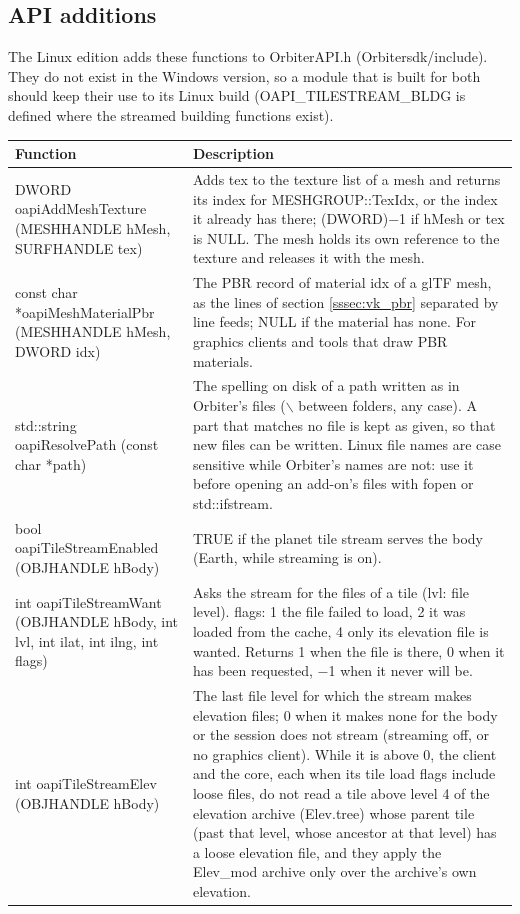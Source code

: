 \documentclass[Orbiter Developer Manual.tex]{subfiles}
\begin{document}
\begin{sloppypar}
\subsection{API additions}
\label{ssec:vk_api}
The Linux edition adds these functions to OrbiterAPI.h (Orbitersdk/include). They do not exist in the Windows version, so a module that is built for both should keep their use to its Linux build (OAPI\_TILESTREAM\_BLDG is defined where the streamed building functions exist).

	\begin{longtable}{ |>{\raggedright\arraybackslash}p{}|p{}| }
	\hline\rule{0pt}{2ex}
	\textbf{Function} & \textbf{Description}\\
	\hline\rule{0pt}{2ex}
	DWORD oapiAddMeshTexture (MESHHANDLE hMesh, SURFHANDLE tex) & Adds tex to the texture list of a mesh and returns its index for MESHGROUP::TexIdx, or the index it already has there; (DWORD)$-$1 if hMesh or tex is NULL. The mesh holds its own reference to the texture and releases it with the mesh.\\
	\hline\rule{0pt}{2ex}
	const char *oapiMeshMaterialPbr (MESHHANDLE hMesh, DWORD idx) & The PBR record of material idx of a glTF mesh, as the lines of section \ref{sssec:vk_pbr} separated by line feeds; NULL if the material has none. For graphics clients and tools that draw PBR materials.\\
	\hline\rule{0pt}{2ex}
	std::string oapiResolvePath (const char *path) & The spelling on disk of a path written as in Orbiter's files ($\backslash$ between folders, any case). A part that matches no file is kept as given, so that new files can be written. Linux file names are case sensitive while Orbiter's names are not: use it before opening an add-on's files with fopen or std::ifstream.\\
	\hline\rule{0pt}{2ex}
	bool oapiTileStreamEnabled (OBJHANDLE hBody) & TRUE if the planet tile stream serves the body (Earth, while streaming is on).\\
	\hline\rule{0pt}{2ex}
	int oapiTileStreamWant (OBJHANDLE hBody, int lvl, int ilat, int ilng, int flags) & Asks the stream for the files of a tile (lvl: file level). flags: 1 the file failed to load, 2 it was loaded from the cache, 4 only its elevation file is wanted. Returns 1 when the file is there, 0 when it has been requested, $-$1 when it never will be.\\
	\hline\rule{0pt}{2ex}
	int oapiTileStreamElev (OBJHANDLE hBody) & The last file level for which the stream makes elevation files; 0 when it makes none for the body or the session does not stream (streaming off, or no graphics client). While it is above 0, the client and the core, each when its tile load flags include loose files, do not read a tile above level 4 of the elevation archive (Elev.tree) whose parent tile (past that level, whose ancestor at that level) has a loose elevation file, and they apply the Elev\_mod archive only over the archive's own elevation.\\

\end{longtable}
\end{sloppypar}
\end{document}
